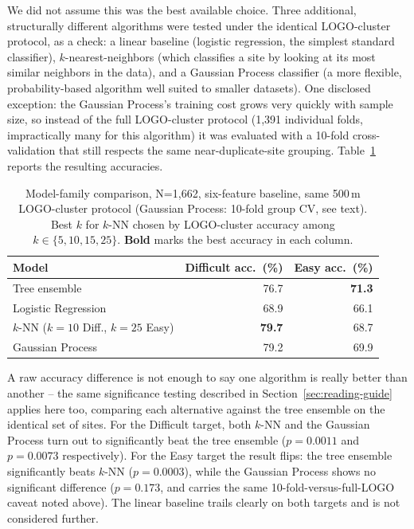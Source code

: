 \documentclass[11pt,a4paper]{article}
\begin{document}
We did not assume this was the best available choice. Three additional, structurally different algorithms were tested under the identical LOGO-cluster protocol, as a check: a linear baseline (logistic regression, the simplest standard classifier), $k$-nearest-neighbors (which classifies a site by looking at its most similar neighbors in the data), and a Gaussian Process classifier (a more flexible, probability-based algorithm well suited to smaller datasets). One disclosed exception: the Gaussian Process's training cost grows very quickly with sample size, so instead of the full LOGO-cluster protocol (1{,}391 individual folds, impractically many for this algorithm) it was evaluated with a 10-fold cross-validation that still respects the same near-duplicate-site grouping. Table~\ref{tab:model-family} reports the resulting accuracies.

\begin{table}[H]
\centering\small
\caption{Model-family comparison, N=1{,}662, six-feature baseline, same 500\,m LOGO-cluster protocol (Gaussian Process: 10-fold group CV, see text). Best $k$ for $k$-NN chosen by LOGO-cluster accuracy among $k\in\{5,10,15,25\}$. \textbf{Bold} marks the best accuracy in each column.}
\label{tab:model-family}
\begin{tabular}{@{}lrr@{}}
\toprule
Model & Difficult acc.\ (\%) & Easy acc.\ (\%) \\
\midrule
Tree ensemble & 76.7 & \textbf{71.3} \\
Logistic Regression & 68.9 & 66.1 \\
$k$-NN ($k=10$ Diff., $k=25$ Easy) & \textbf{79.7} & 68.7 \\
Gaussian Process & 79.2 & 69.9 \\
\bottomrule
\end{tabular}
\end{table}

A raw accuracy difference is not enough to say one algorithm is really better than another -- the same significance testing described in Section~\ref{sec:reading-guide} applies here too, comparing each alternative against the tree ensemble on the identical set of sites. For the Difficult target, both $k$-NN and the Gaussian Process turn out to significantly beat the tree ensemble ($p=0.0011$ and $p=0.0073$ respectively). For the Easy target the result flips: the tree ensemble significantly beats $k$-NN ($p=0.0003$), while the Gaussian Process shows no significant difference ($p=0.173$, and carries the same 10-fold-versus-full-LOGO caveat noted above). The linear baseline trails clearly on both targets and is not considered further.
\end{document}
